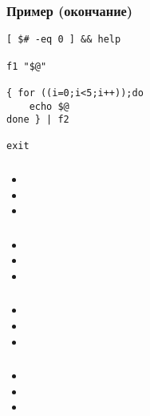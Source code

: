 \begin{frame}[fragile]
	\frametitle{Пример (окончание)}
	\small
	\begin{lstlisting}
[ $# -eq 0 ] && help

f1 "$@"

{ for ((i=0;i<5;i++));do
	echo $@
done } | f2

exit
	\end{lstlisting}

\end{frame}

\begin{frame}
	\frametitle{}
	\begin{itemize}
		\item 
		\item 
		\item
  \end{itemize}
\end{frame}

\begin{frame}
	\frametitle{}
	\begin{itemize}
		\item 
		\item 
		\item
  \end{itemize}
\end{frame}

\begin{frame}
	\frametitle{}
	\begin{itemize}
		\item 
		\item 
		\item
  \end{itemize}
\end{frame}

\begin{frame}
	\frametitle{}
	\begin{itemize}
		\item 
		\item 
		\item
  \end{itemize}
\end{frame}




